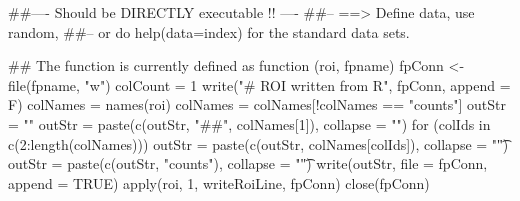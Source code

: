 \documentclass[a4paper]{book}
\begin{document}
%
\begin{Examples}
\begin{ExampleCode}
##---- Should be DIRECTLY executable !! ----
##-- ==>  Define data, use random,
##--	or do  help(data=index)  for the standard data sets.

## The function is currently defined as
function (roi, fpname) 
{
    fpConn <- file(fpname, "w")
    colCount = 1
    write("# ROI written from R", fpConn, append = F)
    colNames = names(roi)
    colNames = colNames[!colNames == "counts"]
    outStr = ""
    outStr = paste(c(outStr, "##", colNames[1]), collapse = "")
    for (colIds in c(2:length(colNames))) {
        outStr = paste(c(outStr, colNames[colIds]), collapse = "\t")
    }
    outStr = paste(c(outStr, "counts"), collapse = "\t")
    write(outStr, file = fpConn, append = TRUE)
    apply(roi, 1, writeRoiLine, fpConn)
    close(fpConn)
  }
\end{ExampleCode}
\end{Examples}
\printindex{}
\end{document}
